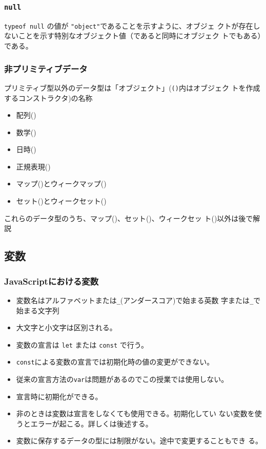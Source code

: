 \begin{frame}[containsverbatim]
 \frametitle{\texttt{null}}
\Verb+typeof null+ の値が \Verb+"object"+であることを示すように、オブジェ
クトが存在しないことを示す特別なオブジェクト値（であると同時にオブジェク
トでもある）である。
\end{frame}
\begin{frame}[containsverbatim]
\frametitle{非プリミティブデータ}
プリミティブ型以外のデータ型は「オブジェクト」(\texttt{()}内はオブジェク
トを作成するコンストラクタ)の名称
\begin{itemize}
 \item 配列()
 \item 数学()
 \item 日時()
 \item 正規表現()
 \item マップ()とウィークマップ()
 \item セット()とウィークセット()
\end{itemize}
 これらのデータ型のうち、マップ()、セット()、ウィークセッ
 ト()以外は後で解説
\end{frame}
\subsection{変数}
\begin{frame}[containsverbatim]
 \frametitle{JavaScriptにおける変数}
\begin{itemize}
 \item 変数名はアルファベットまたは\Verb+_+(アンダースコア)で始まる英数
       字または\Verb+_+で始まる文字列
 \item 大文字と小文字は区別される。
 \item 変数の宣言は \texttt{let} または \texttt{const} で行う。
 \item \texttt{const}による変数の宣言では初期化時の値の変更ができない。
 \item 従来の宣言方法の\texttt{var}は問題があるのでこの授業では使用しない。
 \item 宣言時に初期化ができる。
 \item 非\Strict のときは変数は宣言をしなくても使用できる。初期化してい
       ない変数を使うとエラーが起こる。詳しくは後述する。
 \item 変数に保存するデータの型には制限がない。途中で変更することもでき
       る。
\end{itemize}
\end{frame}
